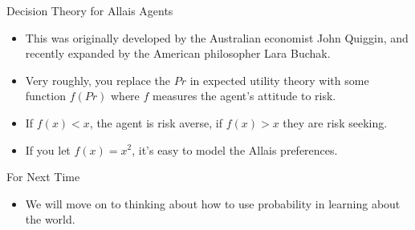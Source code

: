 \documentclass[
  ignorenonframetext,
]{beamer}
\providecommand{\tightlist}{%
  \setlength{\itemsep}{0pt}\setlength{\parskip}{0pt}}
\renewcommand{\,}{\text{, }}
\begin{document}
\begin{frame}{Decision Theory for Allais Agents}
\protect\hypertarget{decision-theory-for-allais-agents}{}

\begin{itemize}
\tightlist
\item
  This was originally developed by the Australian economist John
  Quiggin, and recently expanded by the American philosopher Lara
  Buchak.
\item
  Very roughly, you replace the \(Pr\) in expected utility theory with
  some function \(f(Pr)\) where \(f\) measures the agent's attitude to
  risk.
\item
  If \(f(x) < x\), the agent is risk averse, if \(f(x) > x\) they are
  risk seeking.
\item
  If you let \(f(x) = x^2\), it's easy to model the Allais preferences.
\end{itemize}

\end{frame}

\begin{frame}{For Next Time}
\protect\hypertarget{for-next-time}{}

\begin{itemize}
\tightlist
\item
  We will move on to thinking about how to use probability in learning
  about the world.
\end{itemize}

\end{frame}
\end{document}
